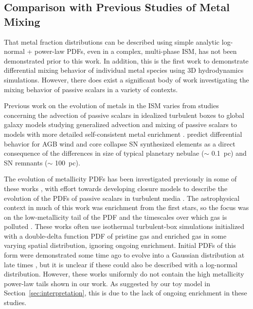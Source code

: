 \subsection{
        Comparison with 
Previous Studies of Metal Mixing}
\label{sec:context}
That metal fraction distributions can be described using simple analytic log-normal + power-law PDFs, even in a complex, multi-phase ISM, has not been demonstrated prior to this work. In addition, this is the first work to demonstrate differential mixing behavior of individual metal species using 3D hydrodynamics simulations. However, there does exist a significant body of work investigating the mixing behavior of passive scalars in a variety of contexts.

Previous work on the evolution of metals in the ISM varies from studies concerning the advection of passive scalars in idealized turbulent boxes \citep[e.g.][]{Pope1991, PanScannapieco2010, PanScannapiecoScalo2012, PanScannapiecoScalo2013, YangKrumholz2012, SurPanScannapieco2014, Colbrook2017}
to global galaxy models studying generalized advection and mixing of passive scalars \citep[e.g.][]{deAvillez2002,Petit2015,Goldbaum2016} to models with more detailed self-consistent metal enrichment \citep[e.g.][]{Revaz2009,Escala2018}.
\cite{KrumholzTing2018} predict differential behavior for AGB wind and core collapse SN synthesized elements as a direct consequence of the differences in size of typical planetary nebulae ($\sim$ 0.1~pc) and SN remnants ($\sim$ 100~pc).

The evolution of metallicity PDFs has been investigated previously in some of these works \citep[see ][ and references therein]{PanScannapiecoScalo2012,PanScannapiecoScalo2013}, with effort towards developing closure models to describe the evolution of the PDFs of passive scalars in turbulent media \citep[e.g.][]{EswaranPope1988,Chen1989,Pope1991}. The astrophysical context in much of this work was enrichment from the first stars, so the focus was on the low-metallicity tail of the PDF and the timescales over which gas is polluted \citep[e.g.][]{PanScannapiecoScalo2013,Sarmento2017}. These works often use isothermal turbulent-box simulations initialized with a double-delta function PDF of pristine gas and enriched gas in some varying spatial distribution, ignoring ongoing enrichment. Initial PDFs of this form were demonstrated some time ago to evolve into a Gaussian distribution at late times \citep{EswaranPope1988}, but it is unclear if these could also be described with a log-normal distribution. However, these works uniformly do not contain the high metallicity power-law tails shown in our work. As suggested by our toy model in Section~\ref{sec:interpretation}, this is due to the lack of ongoing enrichment in these studies.

